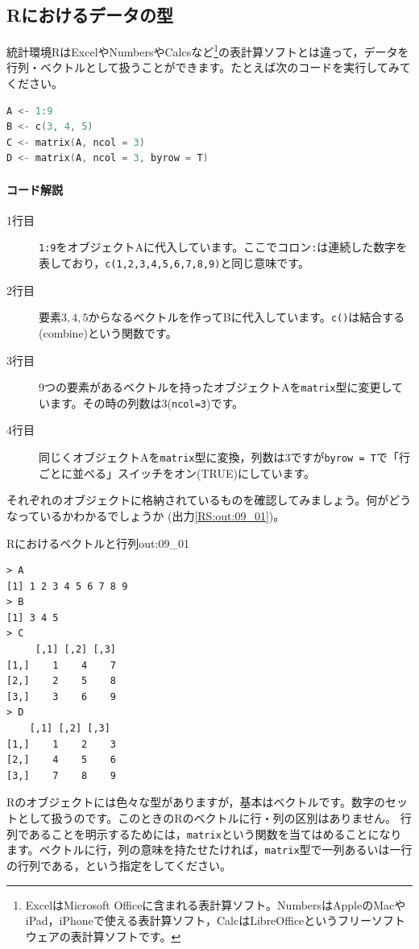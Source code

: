 \documentclass{ltjsbook}
\begin{document}
\subsection{Rにおけるデータの型}
統計環境RはExcelやNumbersやCalcsなど\footnote{ExcelはMicrosoft Officeに含まれる表計算ソフト。NumbersはAppleのMacやiPad，iPhoneで使える表計算ソフト，CalcはLibreOfficeというフリーソフトウェアの表計算ソフトです。}の表計算ソフトとは違って，データを行列・ベクトルとして扱うことができます。たとえば次のコードを実行してみてください。

\begin{lstlisting}[language=c++,label={code:09_01},caption={ベクトルデータの保持}]
A <- 1:9
B <- c(3, 4, 5)
C <- matrix(A, ncol = 3)
D <- matrix(A, ncol = 3, byrow = T)
\end{lstlisting}

\paragraph{コード解説}
\begin{description}
	\item[1行目] \texttt{1:9}をオブジェクトAに代入しています。ここでコロン\verb|:|は連続した数字を表しており，\texttt{c(1,2,3,4,5,6,7,8,9)}と同じ意味です。
	\item[2行目] 要素$3,4,5$からなるベクトルを作ってBに代入しています。\texttt{c()}は結合する(combine)という関数です。
	\item[3行目] 9つの要素があるベクトルを持ったオブジェクトAを\texttt{matrix}型に変更しています。その時の列数は3(\texttt{ncol=3})です。
	\item[4行目] 同じくオブジェクトAを\texttt{matrix}型に変換，列数は3ですが\texttt{byrow = T}で「行ごとに並べる」スイッチをオン(TRUE)にしています。
\end{description}

それぞれのオブジェクトに格納されているものを確認してみましょう。何がどうなっているかわかるでしょうか
(出力\ref{RS:out:09_01})。

\begin{Rscreen}{Rにおけるベクトルと行列}{out:09_01}
	\begin{verbatim}
> A
[1] 1 2 3 4 5 6 7 8 9
> B
[1] 3 4 5
> C
     [,1] [,2] [,3]
[1,]    1    4    7
[2,]    2    5    8
[3,]    3    6    9
> D
    [,1] [,2] [,3]
[1,]    1    2    3
[2,]    4    5    6
[3,]    7    8    9
    \end{verbatim}
\end{Rscreen}

Rのオブジェクトには色々な型がありますが，基本はベクトルです。数字のセットとして扱うのです。このときのRのベクトルに行・列の区別はありません。
行列であることを明示するためには，\texttt{matrix}という関数を当てはめることになります。ベクトルに行，列の意味を持たせたければ，\texttt{matrix}型で一列あるいは一行の行列である，という指定をしてください。
\end{document}
